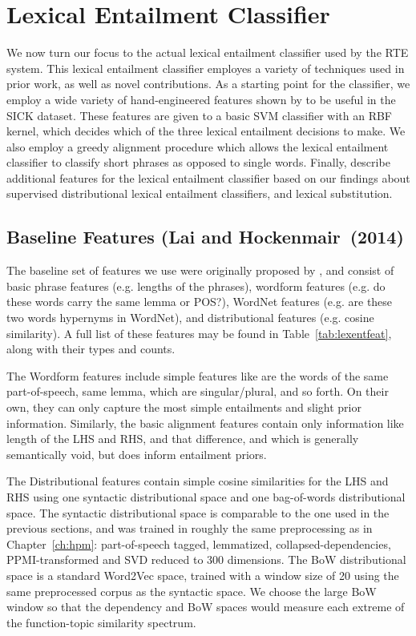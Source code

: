 \section{Lexical Entailment Classifier}

We now turn our focus to the actual lexical entailment classifier used by the
RTE system. This lexical entailment classifier employes a variety of techniques
used in prior work, as well as novel contributions. As a starting point for
the classifier, we employ a wide variety of hand-engineered features
shown by  to be useful in the SICK dataset. These
features are given to a basic SVM classifier with an RBF kernel, which
decides which of the three lexical entailment decisions to make. We also
employ a greedy alignment procedure which allows the lexical entailment
classifier to classify short phrases as opposed to single words.
Finally, describe additional features for the lexical entailment classifier
based on our findings about supervised distributional lexical entailment
classifiers, and lexical substitution.

\subsection{Baseline Features (Lai and Hockenmair~(2014)}

The baseline set of features we use were originally proposed by
, and consist of basic phrase features
(e.g. lengths of the phrases), wordform features (e.g. do these words
carry the same lemma or POS?), WordNet features (e.g. are these two words
hypernyms in WordNet), and distributional features (e.g. cosine similarity).
A full list of these features may be found in Table~\ref{tab:lexentfeat},
along with their types and counts.

The Wordform features include simple features like are the words of the same
part-of-speech, same lemma, which are singular/plural, and so forth. On their
own, they can only capture the most simple entailments and slight prior
information. Similarly, the basic alignment features contain only information
like length of the LHS and RHS, and that difference, and which is generally
semantically void, but does inform entailment priors.

The Distributional features contain simple cosine similarities for the LHS and
RHS using one syntactic distributional space and one bag-of-words
distributional space.
The syntactic distributional space is comparable
to the one used in the previous sections, and was trained in roughly the same
preprocessing as in Chapter~\ref{ch:hpm}: part-of-speech tagged, lemmatized,
collapsed-dependencies, PPMI-transformed and SVD reduced to 300 dimensions.
The BoW distributional space is a standard Word2Vec space, trained with
a window size of 20 using the same preprocessed corpus as the syntactic
space. We choose the large BoW window so that the dependency and BoW spaces
would measure each extreme of the function-topic similarity spectrum.

